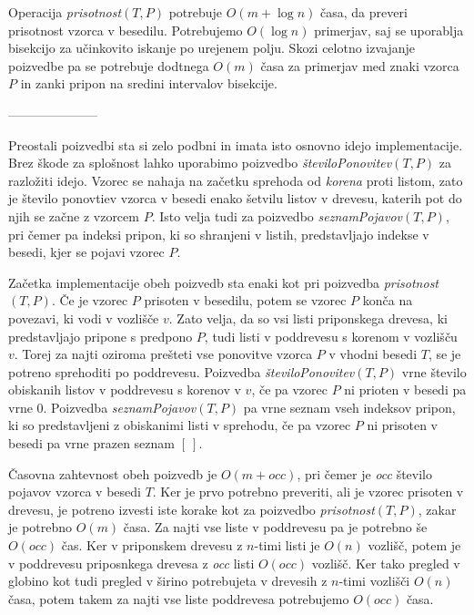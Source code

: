 Operacija \textit{prisotnost}$(T,P)$ potrebuje $O(m+\log{n})$ časa, da preveri prisotnost vzorca v besedilu. Potrebujemo $O(\log{n})$ primerjav, saj se uporablja bisekcijo za učinkovito iskanje po urejenem polju. Skozi celotno izvajanje poizvedbe pa se potrebuje dodtnega $O(m)$ časa za primerjav med znaki vzorca $P$ in zanki pripon na sredini intervalov bisekcije.


---------------------

Preostali poizvedbi sta si zelo podbni in imata isto osnovno idejo implementacije. Brez škode za splošnost lahko uporabimo poizvedbo \textit{številoPonovitev}$(T,P)$ za razložiti idejo. Vzorec se nahaja na začetku sprehoda od \textit{korena} proti listom, zato je število ponovtiev vzorca v besedi enako šetvilu listov v drevesu, katerih pot do njih se začne z vzorcem $P$. Isto velja tudi za poizvedbo \textit{seznamPojavov}$(T,P)$, pri čemer pa indeksi pripon, ki so shranjeni v listih, predstavljajo indekse v besedi, kjer se pojavi vzorec $P$.

Začetka implementacije obeh poizvedb sta enaki kot pri poizvedba \textit{prisotnost}$(T,P)$. Če je vzorec $P$ prisoten v besedilu, potem se vzorec $P$ konča na povezavi, ki vodi v vozlišče $v$. Zato velja, da so vsi listi priponskega drevesa, ki predstavljajo pripone s predpono $P$, tudi listi v poddrevesu s korenom v vozlišču $v$. Torej za najti oziroma prešteti vse ponovitve vzorca $P$ v vhodni besedi $T$, se je potreno sprehoditi po poddrevesu. Poizvedba \textit{številoPonovitev}$(T,P)$ vrne število obiskanih listov v poddrevesu s korenov v $v$, če pa vzorec $P$ ni prioten v besedi pa vrne $0$. Poizvedba \textit{seznamPojavov}$(T,P)$ pa vrne seznam vseh indeksov pripon, ki so predstavljeni z obiskanimi listi v sprehodu, če pa vzorec $P$ ni prisoten v besedi pa vrne prazen seznam $[~]$.

Časovna zahtevnost obeh poizvedb je $O(m+\textit{occ})$, pri čemer je \textit{occ} število pojavov vzorca v besedi $T$. Ker je prvo potrebno preveriti, ali je vzorec prisoten v drevesu, je potreno izvesti iste korake kot za poizvedbo \textit{prisotnost}$(T,P)$, zakar je potrebno $O(m)$ časa. Za najti vse liste v poddrevesu pa je potrebno še $O(\textit{occ})$ čas. Ker v priponskem drevesu z $n$-timi listi je $O(n)$ vozlišč, potem je v poddrevesu priposnkega drevesa z \textit{occ} listi $O(\textit{occ})$ vozlišč. Ker tako pregled v globino kot tudi pregled v širino potrebujeta v drevesih z $n$-timi vozlišči $O(n)$ časa, potem takem za najti vse liste poddrevesa potrebujemo $O(\textit{occ})$ časa.


